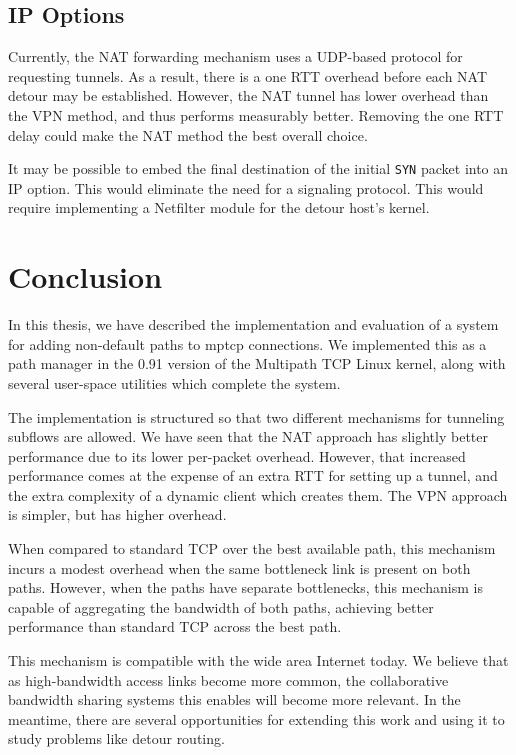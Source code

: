\documentclass{cwru}
\begin{document}
\section{IP Options}

Currently, the NAT forwarding mechanism uses a UDP-based protocol for requesting
tunnels. As a result, there is a one RTT overhead before each NAT detour may be
established. However, the NAT tunnel has lower overhead than the VPN method, and
thus performs measurably better. Removing the one RTT delay could make the NAT
method the best overall choice.

It may be possible to embed the final destination of the initial \texttt{SYN}
packet into an IP option. This would eliminate the need for a signaling
protocol. This would require implementing a Netfilter module for the detour
host's kernel.

\chapter{Conclusion}
\label{c:conclusion}

In this thesis, we have described the implementation and evaluation of a system
for adding non-default paths to \ac{mptcp} connections. We implemented this as a
path manager in the 0.91 version of the Multipath TCP Linux kernel, along with
several user-space utilities which complete the system.

The implementation is structured so that two different mechanisms for tunneling
subflows are allowed. We have seen that the NAT approach has slightly better
performance due to its lower per-packet overhead. However, that increased
performance comes at the expense of an extra RTT for setting up a tunnel, and
the extra complexity of a dynamic client which creates them. The VPN approach is
simpler, but has higher overhead.

When compared to standard TCP over the best available path, this mechanism
incurs a modest overhead when the same bottleneck link is present on both paths.
However, when the paths have separate bottlenecks, this mechanism is capable of
aggregating the bandwidth of both paths, achieving better performance than
standard TCP across the best path.

This mechanism is compatible with the wide area Internet today. We believe that
as high-bandwidth access links become more common, the collaborative bandwidth
sharing systems this enables will become more relevant. In the meantime, there
are several opportunities for extending this work and using it to study problems
like detour routing.

\backmatter
\appendix



\end{document}
